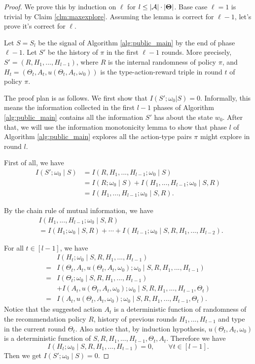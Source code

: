 \begin{proof}
We prove this by induction on $\ell$ for $l \leq |\mathcal{A}|\cdot |\bold{\Theta}|$. Base case $\ell=1$ is trivial by Claim \ref{clm:maxexplore}. Assuming the lemma is correct for $\ell-1$, let's prove it's correct for $\ell$.

Let $S= S_l$ be the signal of Algorithm \ref{alg:public_main} by the end of phase $\ell-1$.  Let $S'$ be the history of $\pi$ in the first $\ell-1$ rounds. More precisely,
    $S' = (R, H_1,...,H_{l-1})$,
where $R$ is the internal randomness of policy $\pi$, and
    $H_t = (\Theta_t, A_t, u(\Theta_t, A_t, \omega_0))$
is the type-action-reward triple in round $t$ of policy $\pi$.

The proof plan is as follows. We first show that $I(S';\omega_0|S) =0 $. Informally, this means the information collected in the first $l-1$ phases of Algorithm \ref{alg:public_main} contains all the information $S'$ has about the state $w_0$. After that, we will use the information monotonicity lemma to show that phase $l$ of Algorithm \ref{alg:public_main} explores all the action-type pairs $\pi$ might explore in round $l$.

First of all, we have
\begin{align*}
I(S'; \omega_0\mid  S)
    &= I(R,H_1,...,H_{l-1}; \omega_0\mid  S)\\
   & = I(R; \omega_0\mid  S) + I(H_1,...,H_{l-1}; \omega_0\mid S, R) \\
    &= I(H_1,...,H_{l-1}; \omega_0\mid S, R).
\end{align*}

By the chain rule of mutual information, we have
\begin{align*}
 &I(H_1,...,H_{l-1}; \omega_0\mid S, R) \\
 &= I(H_1;\omega_0\mid S,R) + \cdots + I(H_{l-1}; \omega_0\mid S,R,H_1,...,H_{l-2}).
\end{align*}

For all $t \in [l-1]$, we have
\begin{align*}
&I(H_t; \omega_0\mid S,R,H_1,...,H_{t-1}) \\
=& I(\Theta_t, A_t, u(\Theta_t, A_t, \omega_0); \omega_0\mid S,R,H_1,...,H_{t-1}) \\
=& I(\Theta_t ; \omega_0\mid S,R,H_1,...,H_{t-1})\\
& +  I(A_t, u(\Theta_t, A_t, \omega_0); \omega_0\mid S,R,H_1,...,H_{t-1},\Theta_t) \\
=& I(A_t, u(\Theta_t, A_t, \omega_0); \omega_0\mid S,R,H_1,...,H_{t-1},\Theta_t).
\end{align*}
Notice that the suggested action $A_t$ is a deterministic function of randomness of the recommendation policy $R$,  history of previous rounds $H_1,...,H_{t-1}$ and type in the current round $\Theta_t$. Also notice that, by induction hypothesis, $u(\Theta_t, A_t, \omega_0)$ is a deterministic function of $S,R,H_1,...,H_{t-1},\Theta_t, A_t$. Therefore we have
\[
I(H_t; \omega_0\mid S,R,H_1,...,H_{t-1}) = 0, \qquad \forall t \in [l-1].
\]
Then we get
$ I(S'; \omega_0 \mid  S) = 0.$


\end{proof}

